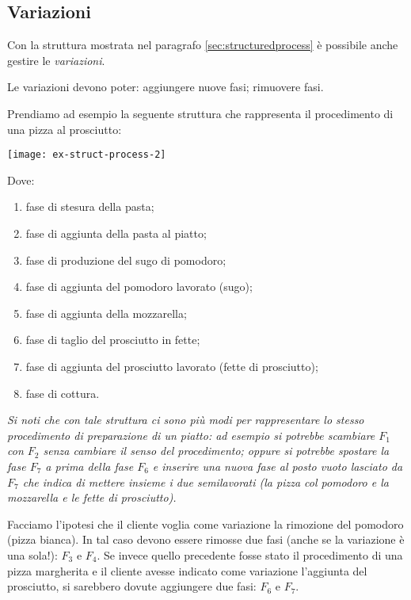 \subsection{Variazioni}\label{subsec:variations}
Con la struttura mostrata nel paragrafo \vref{sec:structuredprocess} è possibile anche
gestire le {\it variazioni}.

Le variazioni devono poter: aggiungere nuove fasi; rimuovere fasi.

Prendiamo ad esempio la seguente struttura che rappresenta il procedimento di una
pizza al prosciutto:

\vspace{5pt}\centerline{\texttt{[image: ex-struct-process-2]}}

\vspace{15pt}

Dove:
\begin{enumerate}[label=$F_{\arabic*}$:]
    \item fase di stesura della pasta;
    \item fase di aggiunta della pasta al piatto;
    \item fase di produzione del sugo di pomodoro;
    \item fase di aggiunta del pomodoro lavorato (sugo);
    \item fase di aggiunta della mozzarella;
    \item fase di taglio del prosciutto in fette;
    \item fase di aggiunta del prosciutto lavorato (fette di prosciutto);
    \item fase di cottura.
\end{enumerate}
\begingroup\itshape\fontsize{10pt}{10pt}\selectfont
    Si noti che con tale struttura ci sono più modi per rappresentare lo stesso procedimento
    di preparazione di un piatto: ad esempio si potrebbe scambiare $F_{1}$ con $F_{2}$ senza
    cambiare il \textnormal{senso} del procedimento; oppure si potrebbe spostare la fase $F_{7}$ a
    prima della fase $F_{6}$ e inserire una nuova fase al posto vuoto lasciato da $F_{7}$ che
    indica di mettere insieme i due \textnormal{semilavorati} (la pizza col pomodoro e la mozzarella
    e le fette di prosciutto).
\endgroup
\vspace{10pt}

Facciamo l'ipotesi che il cliente voglia come variazione la rimozione del pomodoro
(pizza bianca). In tal caso devono essere rimosse due fasi (anche se la variazione è
una sola!): $F_{3}$ e $F_{4}$. Se invece quello precedente fosse stato il procedimento
di una pizza margherita e il cliente avesse indicato come variazione l'aggiunta del
prosciutto, si sarebbero dovute aggiungere due fasi: $F_{6}$ e $F_{7}$.

